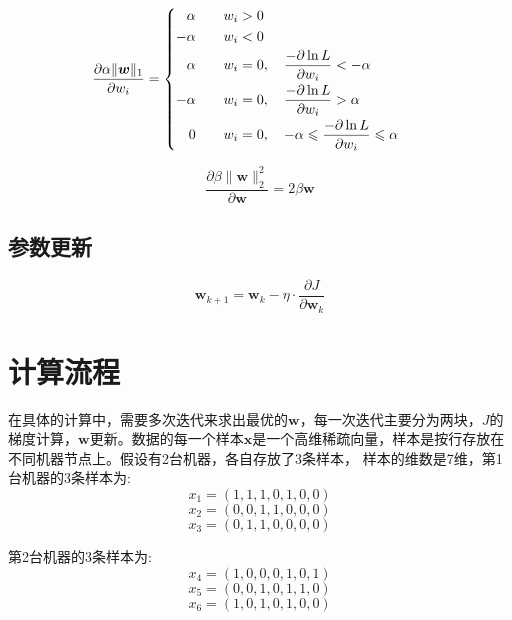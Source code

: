 \documentclass[UTF8,10pt, twoside]{article}
\begin{document}
\begin{equation}
\frac{\partial \alpha \|\bm{w}\|_1}{ \partial w_i} = 
\begin{cases}
\begin{aligned} 
\alpha \qquad  w_{i} &> 0  \cr 
-\alpha \qquad  w_{i} &< 0  \cr 
\alpha \qquad  w_{i} &= 0, \quad \frac{-\partial \ln L}{\partial w_{i}}<-\alpha \cr 
-\alpha \qquad  w_{i} &= 0, \quad \frac{-\partial \ln L}{\partial w_{i}}>\alpha \cr
0 \qquad       w_{i} &= 0, \quad -\alpha\leqslant\frac{-\partial \ln L}{\partial w_{i}}\leqslant\alpha
\end{aligned}
\end{cases}
\end{equation}

\begin{equation}
\frac{\partial \beta \|\bm{w}\|_2^2}{ \partial \bm{w}} = 2 \beta \bm{w}
\end{equation}

\subsection{参数更新}
\begin{equation}
\bm{w}_{k+1} = \bm{w}_k - \eta \cdot \frac{\partial J}{\partial \bm{w}_k}
\end{equation}
  
  
\section{计算流程}
在具体的计算中，需要多次迭代来求出最优的\(\bm{w}\)，每一次迭代主要分为两块，\(J\)的梯度计算，\(\bm{w}\)更新。数据的每一个样本\(\bm{x}\)是一个高维稀疏向量，样本是按行存放在不同机器节点上。假设有2台机器，各自存放了3条样本， 样本的维数是7维，第1台机器的3条样本为:
\[x_1 =  (1,1,1,0,1,0,0) \]
\[x_2 =  (0,0,1,1,0,0,0) \]
\[x_3 =  (0,1,1,0,0,0,0) \]

第2台机器的3条样本为:
\[x_4 = (1,0,0,0,1,0,1) \]
\[x_5 = (0,0,1,0,1,1,0) \]
\[x_6 = (1,0,1,0,1,0,0) \]
\end{document}

